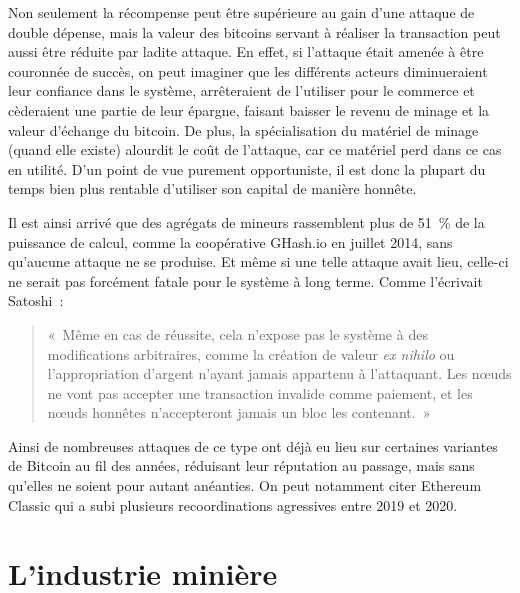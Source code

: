 Non seulement la récompense peut être supérieure au gain d'une attaque de double dépense, mais la valeur des bitcoins servant à réaliser la transaction peut aussi être réduite par ladite attaque. En effet, si l'attaque était amenée à être couronnée de succès, on peut imaginer que les différents acteurs diminueraient leur confiance dans le système, arrêteraient de l'utiliser pour le commerce et cèderaient une partie de leur épargne, faisant baisser le revenu de minage et la valeur d'échange du bitcoin. De plus, la spécialisation du matériel de minage (quand elle existe) alourdit le coût de l'attaque, car ce matériel perd dans ce cas en utilité. D'un point de vue purement opportuniste, il est donc la plupart du temps bien plus rentable d'utiliser son capital de manière honnête.

Il est ainsi arrivé que des agrégats de mineurs rassemblent plus de 51~\% de la puissance de calcul, comme la coopérative GHash.io en juillet 2014, sans qu'aucune attaque ne se produise. Et même si une telle attaque avait lieu, celle-ci ne serait pas forcément fatale pour le système à long terme. Comme l'écrivait Satoshi~:

\begin{quote}
«~Même en cas de réussite, cela n'expose pas le système à des modifications arbitraires, comme la création de valeur \emph{ex nihilo} ou l'appropriation d'argent n'ayant jamais appartenu à l'attaquant. Les nœuds ne vont pas accepter une transaction invalide comme paiement, et les nœuds honnêtes n'accepteront jamais un bloc les contenant.~»
\end{quote}

Ainsi de nombreuses attaques de ce type ont déjà eu lieu sur certaines variantes de Bitcoin au fil des années, réduisant leur réputation au passage, mais sans qu'elles ne soient pour autant anéanties. On peut notamment citer Ethereum Classic qui a subi plusieurs recoordinations agressives entre 2019 et 2020.

\section*{L'industrie minière}

